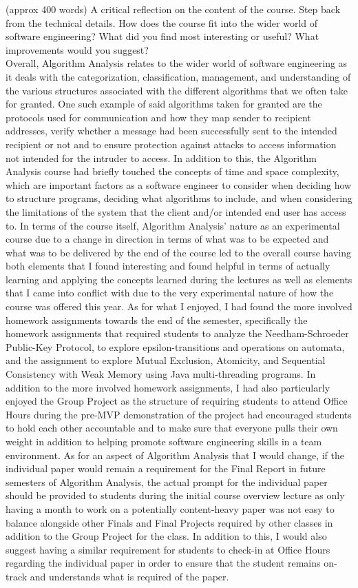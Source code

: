 \documentclass{article}
\theoremstyle{theorem}
\theoremstyle{definition}
\theoremstyle{remark}
\begin{document}
(approx 400 words) A critical reflection on the content of the course. Step back from the technical details. How does the course fit into the wider world of software engineering? What did you find most interesting or useful? What improvements would you suggest? \\


Overall, Algorithm Analysis relates to the wider world of software engineering as it deals with the categorization, classification, management, and understanding of the various structures associated with the different algorithms that we often take for granted. One such example of said algorithms taken for granted are the protocols used for communication and how they map sender to recipient addresses, verify whether a message had been successfully sent to the intended recipient or not and to ensure protection against attacks to access information not intended for the intruder to access. In addition to this, the Algorithm Analysis course had briefly touched the concepts of time and space complexity, which are important factors as a software engineer to consider when deciding how to structure programs, deciding what algorithms to include, and when considering the limitations of the system that the client and/or intended end user has access to. In terms of the course itself, Algorithm Analysis’ nature as an experimental course due to a change in direction in terms of what was to be expected and what was to be delivered by the end of the course led to the overall course having both elements that I found interesting and found helpful in terms of actually learning and applying the concepts learned during the lectures as well as elements that I came into conflict with due to the very experimental nature of how the course was offered this year. As for what I enjoyed, I had found the more involved homework assignments towards the end of the semester, specifically the homework assignments that required students to analyze the Needham-Schroeder Public-Key Protocol, to explore epsilon-transitions and operations on automata, and the assignment to explore Mutual Exclusion, Atomicity, and Sequential Consistency with Weak Memory using Java multi-threading programs. In addition to the more involved homework assignments, I had also particularly enjoyed the Group Project as the structure of requiring students to attend Office Hours during the pre-MVP demonstration of the project had encouraged students to hold each other accountable and to make sure that everyone pulls their own weight in addition to helping promote software engineering skills in a team environment. As for an aspect of Algorithm Analysis that I would change, if the individual paper would remain a requirement for the Final Report in future semesters of Algorithm Analysis, the actual prompt for the individual paper should be provided to students during the initial course overview lecture as only having a month to work on a potentially content-heavy paper was not easy to balance alongside other Finals and Final Projects required by other classes in addition to the Group Project for the class. In addition to this, I would also suggest having a similar requirement for students to check-in at Office Hours regarding the individual paper in order to ensure that the student remains on-track and understands what is required of the paper.
\end{document}
